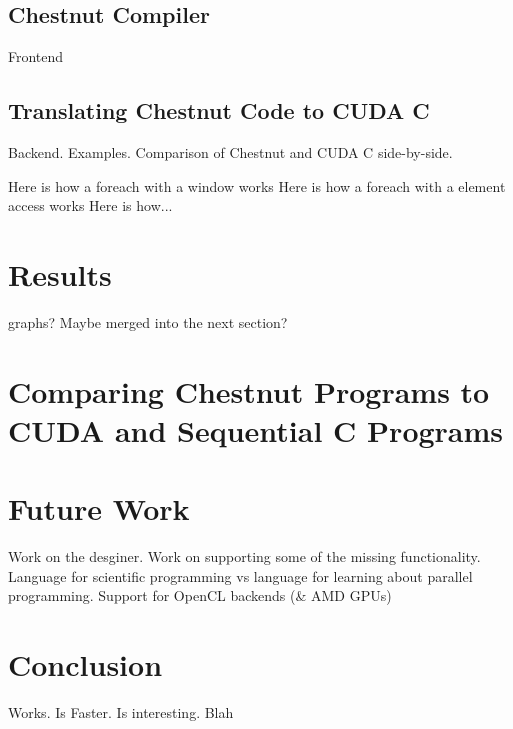 \subsection{Chestnut Compiler}

Frontend

\subsection{Translating Chestnut Code to CUDA C}

Backend. Examples. Comparison of Chestnut and CUDA C side-by-side.

Here is how a foreach with a window works
Here is how a foreach with a element access works
Here is how...

   

\section{Results}

graphs? Maybe merged into the next section?




\section{Comparing Chestnut Programs to CUDA and Sequential C Programs}



\section{Future Work}

Work on the desginer. Work on supporting some of the missing functionality. Language for scientific programming vs language for learning about parallel programming. Support for OpenCL backends (\& AMD GPUs)



\section{Conclusion}

Works. Is Faster. Is interesting. Blah
